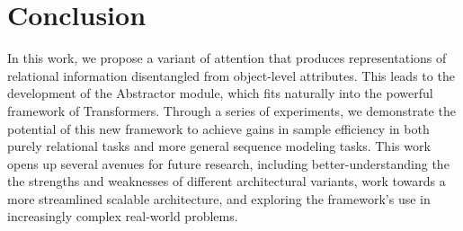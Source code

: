 \section{Conclusion}\label{sec:discuss}


In this work, we propose a variant of attention that produces representations of relational information disentangled from object-level attributes. This leads to the development of the Abstractor module, which fits naturally into the powerful framework of Transformers. Through a series of experiments, we demonstrate the potential of this new framework to achieve gains in sample efficiency in both purely relational tasks and more general sequence modeling tasks. This work opens up several avenues for future research, including better-understanding the the strengths and weaknesses of different architectural variants, work towards a more streamlined scalable architecture, and exploring the framework's use in increasingly complex real-world problems.

